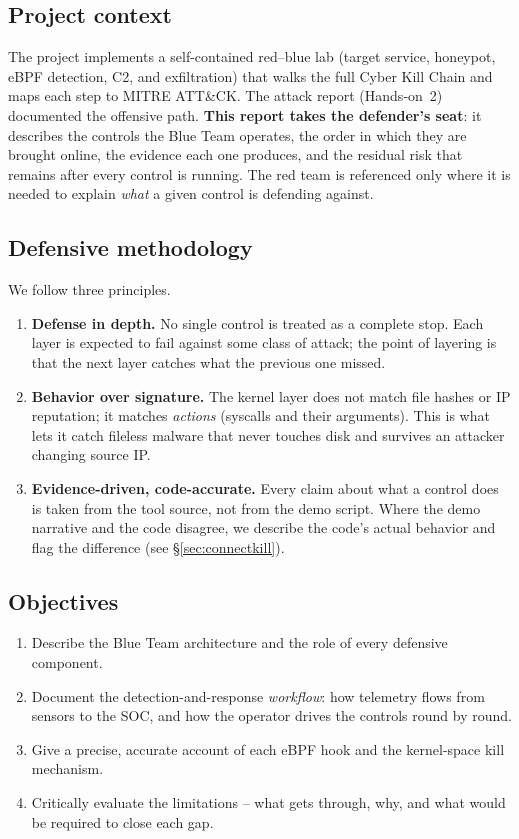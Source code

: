 \documentclass[11pt]{article}
\begin{document}
\subsection{Project context}
The project implements a self-contained red--blue lab (target service,
honeypot, eBPF detection, C2, and exfiltration) that walks the full Cyber
Kill Chain and maps each step to MITRE ATT\&CK. The attack report
(Hands-on~2) documented the offensive path. \textbf{This report takes the
defender's seat}: it describes the controls the Blue Team operates, the
order in which they are brought online, the evidence each one produces, and
the residual risk that remains after every control is running. The red team
is referenced only where it is needed to explain \emph{what} a given control
is defending against.

\subsection{Defensive methodology}
We follow three principles.
\begin{enumerate}[leftmargin=1.4em]
  \item \textbf{Defense in depth.} No single control is treated as a
        complete stop. Each layer is expected to fail against some class of
        attack; the point of layering is that the next layer catches what
        the previous one missed.
  \item \textbf{Behavior over signature.} The kernel layer does not match
        file hashes or IP reputation; it matches \emph{actions}
        (syscalls and their arguments). This is what lets it catch fileless
        malware that never touches disk and survives an attacker changing
        source IP.
  \item \textbf{Evidence-driven, code-accurate.} Every claim about what a
        control does is taken from the tool source, not from the demo
        script. Where the demo narrative and the code disagree, we describe
        the code's actual behavior and flag the difference
        (see \S\ref{sec:connectkill}).
\end{enumerate}

\subsection{Objectives}
\begin{enumerate}[leftmargin=1.4em]
  \item Describe the Blue Team architecture and the role of every defensive
        component.
  \item Document the detection-and-response \emph{workflow}: how telemetry
        flows from sensors to the SOC, and how the operator drives the
        controls round by round.
  \item Give a precise, accurate account of each eBPF hook and the
        kernel-space kill mechanism.
  \item Critically evaluate the limitations -- what gets through, why, and
        what would be required to close each gap.
\end{enumerate}
\end{document}
